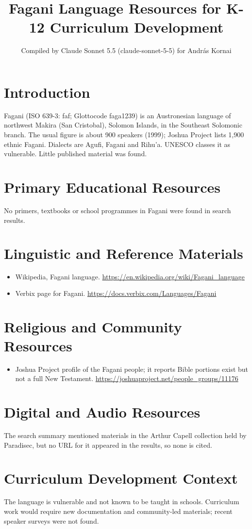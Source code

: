 \documentclass[12pt]{article}
\title{Fagani Language Resources for K-12 Curriculum Development}
\author{Compiled by Claude Sonnet 5.5 (claude-sonnet-5-5) for Andr\'as Kornai}
\date{}
\begin{document}
\maketitle

\section{Introduction}
Fagani (ISO 639-3: faf; Glottocode faga1239) is an Austronesian language of northwest Makira (San Cristobal), Solomon Islands, in the Southeast Solomonic branch. The usual figure is about 900 speakers (1999); Joshua Project lists 1,900 ethnic Fagani. Dialects are Agufi, Fagani and Rihu'a. UNESCO classes it as vulnerable. Little published material was found.

\section{Primary Educational Resources}
No primers, textbooks or school programmes in Fagani were found in search results.

\section{Linguistic and Reference Materials}
\begin{itemize}
\item Wikipedia, Fagani language. \url{https://en.wikipedia.org/wiki/Fagani_language}
\item Verbix page for Fagani. \url{https://docs.verbix.com/Languages/Fagani}
\end{itemize}

\section{Religious and Community Resources}
\begin{itemize}
\item Joshua Project profile of the Fagani people; it reports Bible portions exist but not a full New Testament. \url{https://joshuaproject.net/people_groups/11176}
\end{itemize}

\section{Digital and Audio Resources}
The search summary mentioned materials in the Arthur Capell collection held by Paradisec, but no URL for it appeared in the results, so none is cited.

\section{Curriculum Development Context}
The language is vulnerable and not known to be taught in schools. Curriculum work would require new documentation and community-led materials; recent speaker surveys were not found.
\end{document}
